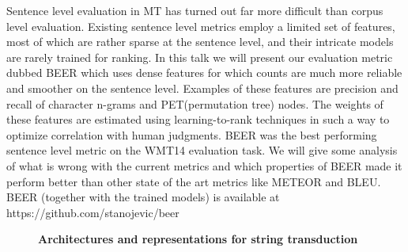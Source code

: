 \documentclass[10pt, a4paper, twopage, headinclude, footinclude, BCOR5mm]{scrartcl}
\begin{document}
        \begin{table}[t!]
    \end{table}

\noindent
Sentence level evaluation in MT has turned out far more difficult than corpus level evaluation. Existing sentence level metrics employ a limited set of features, most of which are rather sparse at the sentence level, and their intricate models are rarely trained for ranking. In this talk we will present our evaluation metric dubbed BEER which uses dense features for which counts are much more reliable and smoother on the sentence level. Examples of these features are precision and recall of character n-grams and PET(permutation tree) nodes. The weights of these features are estimated using learning-to-rank techniques in such a way to optimize correlation with human judgments. BEER was the best performing sentence level metric on the WMT14 evaluation task. We will give some analysis of what is wrong with the current metrics and which properties of BEER made it perform better than other state of the art metrics like METEOR and BLEU. BEER (together with the trained models) is available at https://github.com/stanojevic/beer


\newpage

\begin{figure}[t!]
\centering
\large\textbf{Architectures and representations for string transduction}
\vspace*{0.5cm}
\end{figure}


        \begin{table}[t!]
    \end{table}
\end{document}

